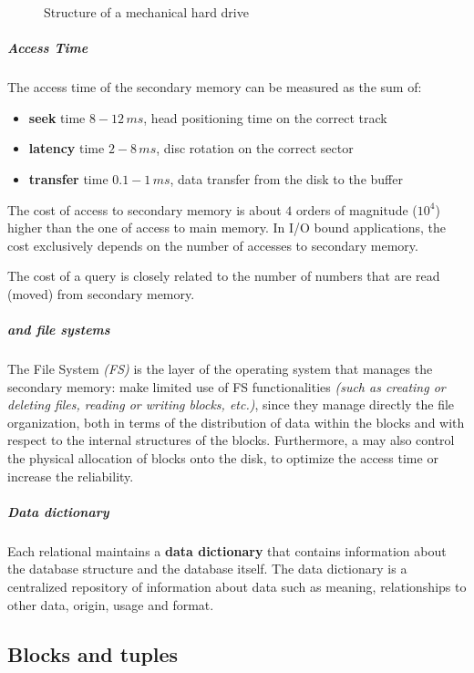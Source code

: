 \documentclass[english]{article}
\begin{document}
\begin{figure}[htbp]
  \centering
  \bigskip
  \caption{Structure of a mechanical hard drive}
  \label{figure:hdd-structure}
  \bigskip
\end{figure}

\subparagraph*{Access Time}
The access time of the secondary memory can be measured as the sum of:
\begin{itemize}
  \item \textbf{seek} time \(8-12 \, ms\), head positioning time on the correct track
  \item \textbf{latency} time \(2-8 \, ms\), disc rotation on the correct sector
  \item \textbf{transfer} time \(0.1-1 \, ms\), data transfer from the disk to the buffer
\end{itemize}

The cost of access to secondary memory is about \(4\) orders of magnitude (\(10^4\)) higher than the one of access to main memory.
In I/O bound applications, the cost exclusively depends on the number of accesses to secondary memory.

The cost of a query is closely related to the number of numbers that are read (moved) from secondary memory.

\subparagraph*{\dbms and file systems}
The File System \textit{(FS)} is the layer of the operating system that manages the secondary memory:
\dbms make limited use of FS functionalities \textit{(such as creating or deleting files, reading or writing blocks, etc.)}, since they manage directly the file organization, both in terms of the distribution of data within the blocks and with respect to the internal structures of the blocks.
Furthermore, a \dbms may also control the physical allocation of blocks onto the disk, to optimize the access time or increase the reliability.

\subparagraph*{Data dictionary}

Each relational \dbms maintains a \textbf{data dictionary} that contains information about the database structure and the database itself.
The data dictionary is a centralized repository of information about data such as meaning, relationships to other data, origin, usage and format.

\subsection{Blocks and tuples}
\end{document}
